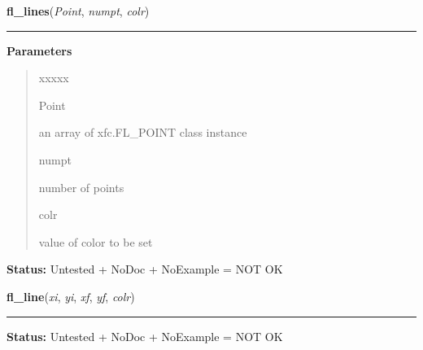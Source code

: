 \hspace{.8\funcindent}\begin{boxedminipage}{\funcwidth}

    \raggedright \textbf{fl\_lines}(\textit{Point}, \textit{numpt}, \textit{colr})

    \vspace{-1.5ex}

    \rule{\textwidth}{0.5\fboxrule}
\setlength{\parskip}{2ex}
\setlength{\parskip}{1ex}
      \textbf{Parameters}
      \vspace{-1ex}

      \begin{quote}
        \begin{Ventry}{xxxxx}

          \item[Point]

          an array of xfc.FL\_POINT class instance

          \item[numpt]

          number of points

          \item[colr]

          value of color to be set

        \end{Ventry}

      \end{quote}

\textbf{Status:} Untested + NoDoc + NoExample = NOT OK



    \end{boxedminipage}

    \label{xformslib:library:fl_line}

    \vspace{0.5ex}

\hspace{.8\funcindent}\begin{boxedminipage}{\funcwidth}

    \raggedright \textbf{fl\_line}(\textit{xi}, \textit{yi}, \textit{xf}, \textit{yf}, \textit{colr})

    \vspace{-1.5ex}

    \rule{\textwidth}{0.5\fboxrule}
\setlength{\parskip}{2ex}
\setlength{\parskip}{1ex}
\textbf{Status:} Untested + NoDoc + NoExample = NOT OK



    \end{boxedminipage}

